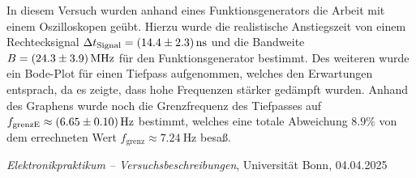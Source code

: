 \documentclass{article}
\begin{document}
        
        In diesem Versuch wurden anhand eines Funktionsgenerators die Arbeit mit einem Oszilloskopen geübt. 
        Hierzu wurde die realistische Anstiegszeit von einem Rechtecksignal 
        $\Delta t_\text{Signal} = \SI{14.4 \pm 2.3}{\nano\second}$
         und die Bandweite $B = \SI{24.3 \pm 3.9}{\mega\hertz}$ für den Funktionsgenerator bestimmt.
         Des weiteren wurde ein Bode-Plot für einen Tiefpass aufgenommen, welches den Erwartungen entsprach, da es 
         zeigte, dass hohe Frequenzen stärker gedämpft wurden. Anhand des Graphens wurde noch die Grenzfrequenz des 
         Tiefpasses auf $f_{\text{grenzE}} \approx \SI{6.65 \pm 0.1}{\hertz}$ bestimmt, welches eine totale Abweichung
           $8.9 \% $ von dem errechneten Wert $ f_{\text{grenz}}
         \approx \SI{7.24}{\hertz}$ besaß.


        \begin{thebibliography}{9}

        \textit{Elektronikpraktikum -- Versuchsbeschreibungen}, Universität Bonn, 04.04.2025


\end{thebibliography}
\end{document}
